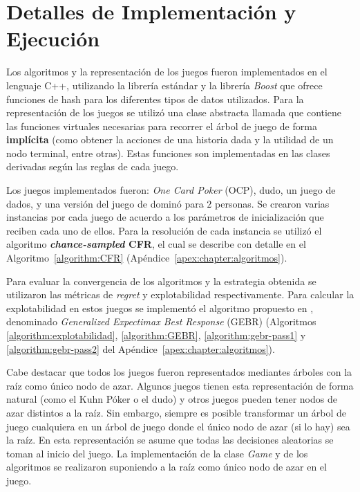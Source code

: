 \section{Detalles de Implementación y Ejecución}

Los algoritmos y la representación de los juegos fueron implementados en el lenguaje C++, utilizando la librería estándar y la librería \textit{Boost} \cite{bib:boost} que ofrece funciones de hash para los diferentes tipos de datos utilizados. Para la representación de los juegos se utilizó una clase abstracta llamada  que contiene las funciones virtuales necesarias para recorrer el árbol de juego de forma \textbf{implícita} (como obtener la acciones de una historia dada y la utilidad de un nodo terminal, entre otras). Estas funciones son implementadas en las clases derivadas según las reglas de cada juego.

Los juegos implementados fueron: \textit{One Card Poker} (OCP), dudo, un juego de dados, y una versión del juego de dominó para $2$ personas. Se crearon varias instancias por cada juego de acuerdo a los parámetros de inicialización que reciben cada uno de ellos. Para la resolución de cada instancia se utilizó el algoritmo \textbf{\textit{chance-sampled} CFR}, el cual se describe con detalle en el Algoritmo~\ref{algorithm:CFR} (Apéndice~\ref{apex:chapter:algoritmos}).

Para evaluar la convergencia de los algoritmos y la estrategia obtenida se utilizaron las métricas de \textit{regret} y explotabilidad respectivamente. Para calcular la explotabilidad en estos juegos se implementó el algoritmo propuesto en \cite{bib:thesis-marc-lanctot}, denominado \textit{Generalized Expectimax Best Response} (GEBR) (Algoritmos \ref{algorithm:explotabilidad}, \ref{algorithm:GEBR}, \ref{algorithm:gebr-pass1} y \ref{algorithm:gebr-pass2} del Apéndice~\ref{apex:chapter:algoritmos}).

Cabe destacar que todos los juegos fueron representados mediantes árboles con la raíz como único nodo de azar. Algunos juegos tienen esta representación de forma natural (como el Kuhn Póker o el dudo) y otros juegos pueden tener nodos de azar distintos a la raíz. Sin embargo, siempre es posible transformar un árbol de juego cualquiera en un árbol de juego donde el único nodo de azar (si lo hay) sea la raíz. En esta representación se asume que todas las decisiones aleatorias se toman al inicio del juego. La implementación de la clase \textit{Game} y de los algoritmos se realizaron suponiendo a la raíz como único nodo de azar en el juego.

